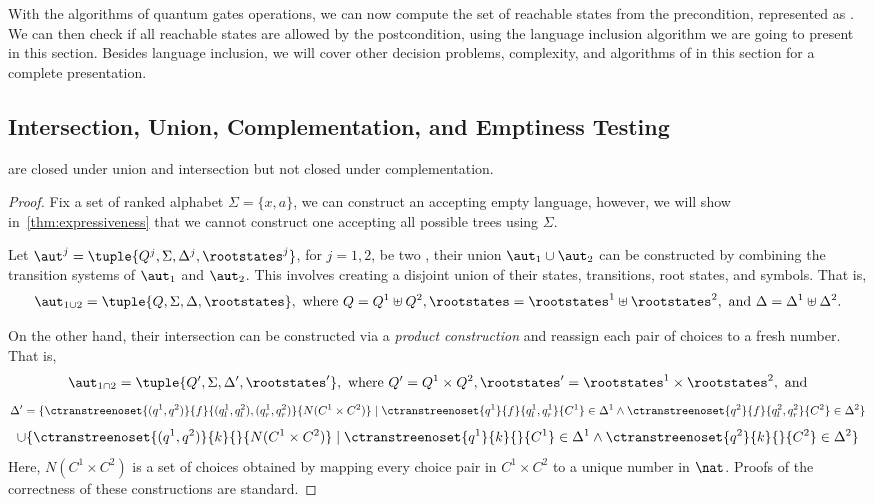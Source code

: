 With the algorithms of \lsta quantum gates operations, we can now compute the set of reachable states from the precondition, represented as \lsta. We can then check if all reachable states are allowed by the postcondition, using the language inclusion algorithm we are going to present in this section. Besides language inclusion, we will cover other decision problems, complexity, and algorithms of \lsta in this section for a complete presentation.

\subsection{Intersection, Union, Complementation, and Emptiness Testing}
\begin{theorem}\label{thm:union_intersecion}
    \lstas are closed under union and intersection but not closed under complementation.
\end{theorem}
\begin{proof}
Fix a set of ranked alphabet $\Sigma=\{x,a\}$, we can construct an \lsta accepting empty language, however, we will show in~\cref{thm:expressiveness} that we cannot construct one accepting all possible trees using $\Sigma$.


 Let $\aut^j=\tuple{Q^j,\Sigma,\Delta^j,\rootstates^j}$, for $j=1,2$, be two \lstas, their union $\aut_1\cup\aut_2$ can be constructed by combining the transition systems of $\aut_1$ and $\aut_2$. This involves creating a disjoint union of their states, transitions, root states, and symbols.
That is, \[\aut_{1\cup 2}= \tuple{Q,\Sigma,\Delta,\rootstates},\mbox{ where }Q = Q^1 \uplus Q^2, \rootstates = \rootstates^1 \uplus \rootstates^2,\mbox{ and }\Delta = \Delta^1 \uplus \Delta^2.\]

 On the other hand, their intersection can be constructed via a \emph{product construction} and reassign each pair of choices to a fresh number. That is, \[\aut_{1\cap 2} = \tuple{Q',\Sigma,\Delta',\rootstates'},\mbox{ where }Q'= Q^1 \times Q^2, \rootstates'=\rootstates^1 \times \rootstates^2,\mbox{ and}\]
\[ \Delta' =  \{
    \ctranstreenoset{(q^1,q^2)}{f}{(q^1_l,q^2_l),(q^1_r,q^2_r)} {N(C^1\times
    C^2)} \mid{}  \ctranstreenoset {q^1} {f} {q^1_l,q^1_r} {C^1}\in \Delta^1 \land {}
    \ctranstreenoset {q^2} {f} {q^2_l,q^2_r}{C^2} \in \Delta^2
  \} \]
\[ \cup \{ \ctranstreenoset{(q^1,q^2)}{k}{}{N(C^1\times C^2)} \mid{} \ctranstreenoset {q^1} {k} {} {C^1}\in \Delta^1 \land {} \ctranstreenoset {q^2} {k} {}{C^2} \in \Delta^2 \}\]
Here, $N(C^1\times
    C^2)$ is a set of choices obtained by mapping every choice pair in $C^1\times
    C^2$ to a unique number in $\nat$.
Proofs of the correctness of these constructions are standard.
\end{proof}

